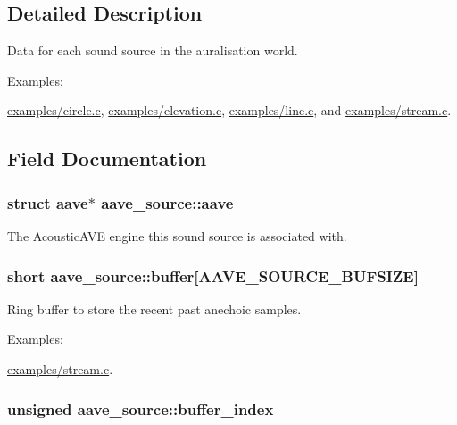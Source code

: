 \subsection{Detailed Description}
Data for each sound source in the auralisation world. \begin{Desc}
\item[Examples\-: ]\par
\hyperlink{examples_2circle_8c-example}{examples/circle.\-c}, \hyperlink{examples_2elevation_8c-example}{examples/elevation.\-c}, \hyperlink{examples_2line_8c-example}{examples/line.\-c}, and \hyperlink{examples_2stream_8c-example}{examples/stream.\-c}.\end{Desc}


\subsection{Field Documentation}
\hypertarget{structaave__source_a5c8d463d1960b8f5c9150f17e31ca230}{
\subsubsection[{aave}]{\setlength{\rightskip}{0pt plus 5cm}struct {\bf aave}$\ast$ aave\-\_\-source\-::aave}}\label{structaave__source_a5c8d463d1960b8f5c9150f17e31ca230}
The Acoustic\-A\-V\-E engine this sound source is associated with. \hypertarget{structaave__source_a25b0c8024c657431c670e52128c429fc}{
\subsubsection[{buffer}]{\setlength{\rightskip}{0pt plus 5cm}short aave\-\_\-source\-::buffer\mbox{[}{\bf A\-A\-V\-E\-\_\-\-S\-O\-U\-R\-C\-E\-\_\-\-B\-U\-F\-S\-I\-Z\-E}\mbox{]}}}\label{structaave__source_a25b0c8024c657431c670e52128c429fc}
Ring buffer to store the recent past anechoic samples. \begin{Desc}
\item[Examples\-: ]\par
\hyperlink{examples_2stream_8c-example}{examples/stream.\-c}.\end{Desc}
\hypertarget{structaave__source_a78b8739c3487c7f4cae4529e61063d64}{
\subsubsection[{buffer\-\_\-index}]{\setlength{\rightskip}{0pt plus 5cm}unsigned aave\-\_\-source\-::buffer\-\_\-index}}\label{structaave__source_a78b8739c3487c7f4cae4529e61063d64}
